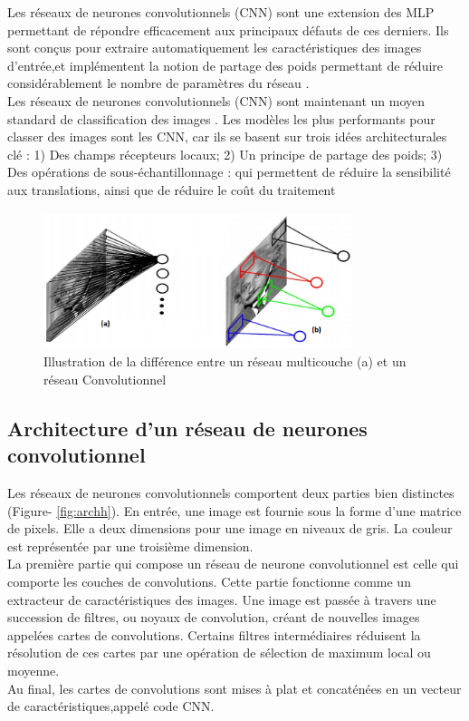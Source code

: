 Les réseaux de neurones convolutionnels (CNN) sont une extension des MLP permettant de répondre efficacement aux principaux défauts de ces derniers. Ils sont conçus pour extraire automatiquement les caractéristiques des images d’entrée,et implémentent la notion de partage des poids permettant de réduire considérablement le
nombre de paramètres du réseau .\\
Les réseaux de neurones convolutionnels (CNN) sont maintenant un moyen standard de classification des images \cite{56}. Les modèles les plus performants pour classer des images sont les CNN, car ils se basent sur trois idées architecturales clé \cite{57}:
1) Des champs récepteurs locaux;
2) Un principe de partage des poids;
3) Des opérations de sous-échantillonnage : qui permettent de réduire la sensibilité aux
translations, ainsi que de réduire le coût du traitement

\begin{figure}[h]
      \centering
      \includegraphics[width=9cm,height=4cm]{images/aysh.png}
      \caption{Illustration de la différence entre un réseau multicouche (a) et un réseau Convolutionnel}
    \label{fig:vol}
\end{figure}

\subsection{Architecture d’un réseau de neurones convolutionnel}

Les réseaux de neurones convolutionnels comportent deux parties bien distinctes (Figure- \ref{fig:archh}). En entrée, une image est fournie sous la forme d’une matrice de pixels. Elle a deux
dimensions pour une image en niveaux de gris.‎ La couleur est représentée par une troisième
dimension.\\
La première partie qui compose un réseau de neurone convolutionnel est celle qui comporte
les couches de convolutions. Cette partie fonctionne comme un extracteur de caractéristiques des
images. Une image est passée à travers une succession de filtres, ou noyaux de convolution, créant
de nouvelles images appelées cartes de convolutions. Certains filtres intermédiaires réduisent la résolution de ces cartes par une opération de sélection de maximum local ou moyenne.\\ 
Au final, les cartes de convolutions sont mises à plat et concaténées en un vecteur de caractéristiques,appelé
code CNN.

